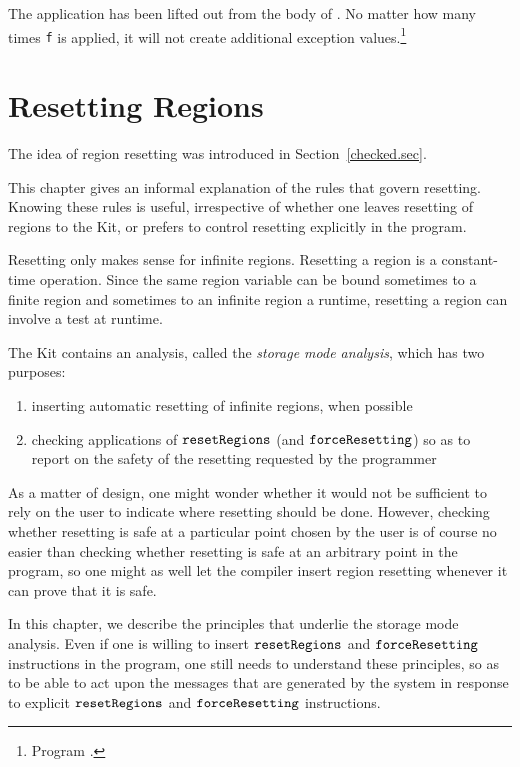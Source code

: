 \documentclass[12pt]{book}
\begin{document}
The application  has been lifted out from the body of
. No matter how many times {\tt f} is applied, it will not
create additional exception values.\footnote{Program
  .}

\chapter{Resetting Regions}
\label{storagemodes.sec}
The idea of region resetting was introduced
in Section~\ref{checked.sec}.
%

This chapter gives an informal explanation of the rules that
govern resetting. Knowing these rules is useful,
irrespective of whether one leaves resetting of regions to the
Kit, or prefers to control resetting explicitly in the program.

Resetting only makes sense for infinite regions. 
Resetting a region is a  constant-time operation.
Since the same region variable can be bound sometimes to a finite region
and sometimes to an infinite region a runtime, resetting a
region can involve a test at runtime.

The Kit contains an analysis, called the {\em storage mode analysis}, which has
two purposes:
\begin{enumerate}
\item inserting automatic resetting of infinite regions, when possible
\item checking applications of $\hbox{\tt resetRegions}$ (and
  $\hbox{\tt forceResetting}$) so as to report on the safety of the resetting requested
  by the programmer
\end{enumerate}

As a matter of design, one might wonder whether it would not be sufficient
to rely on the user to indicate where resetting should be done. However,
checking whether resetting is safe at a particular point chosen
by the user is of course no easier than checking whether resetting is safe
at an arbitrary point in the program, so one might as well let the compiler
insert region resetting whenever it can prove that it is safe. 

In this chapter, we describe the principles that underlie the storage
mode analysis. Even if one is willing to insert $\hbox{\tt resetRegions}$ and
$\hbox{\tt forceResetting}$ instructions in the program, one still needs to understand
these principles, so as to be able to act upon the messages that are
generated by the system in response to explicit $\hbox{\tt resetRegions}$ and
$\hbox{\tt forceResetting}$ instructions.
%
\end{document}
